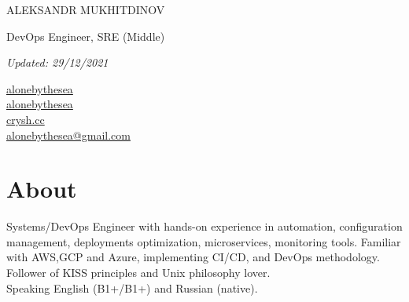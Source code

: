 \documentclass[11pt]{letter}
\newcommand{\forceindent}{\leavevmode{\parindent=1em\indent} %
}
\begin{document}
\begin{spacing}{2}
    {\centerline{{\huge \vphantom{Name}ALEKSANDR MUKHITDINOV}}}
    {\centerline{\large \vphantom{Position}DevOps Engineer, SRE (Middle)}}
    {\centerline{\textit{Updated: 29/12/2021}}}
\end{spacing}

{\setlength{\columnsep}{-0.9cm}\begin{multicols}{4}
    \begin{spacing}{2}\rmfamily
    \large{
        \vphantom{contacts}
        \faLinkedin \href{https://www.linkedin.com/in/alonebythesea}{\vphantom{LinkedIn} alonebythesea} \\
        \columnbreak
        \faGithubAlt \href{https://github.com/alonebythesea}{\vphantom{GitHub} alonebythesea} \\
        \columnbreak
        \faLink \href{https://crysh.cc}{\vphantom{Website} crysh.cc} \\
        \columnbreak
        \faEnvelope \href{mailto:alonebythesea@gmail.com}{\vphantom{Email} alonebythesea@gmail.com} \\
        \columnbreak
    }
  \end{spacing}\end{multicols}}

\section*{About\vphantom{about}}


\forceindent Systems/DevOps Engineer with hands-on experience in automation, configuration management, deployments optimization, microservices, monitoring tools. Familiar with AWS,GCP and Azure, implementing CI/CD, and DevOps methodology. Follower of KISS principles and Unix philosophy lover. \\


\forceindent Speaking English (B1+/B1+) and Russian (native).

\end{document}
